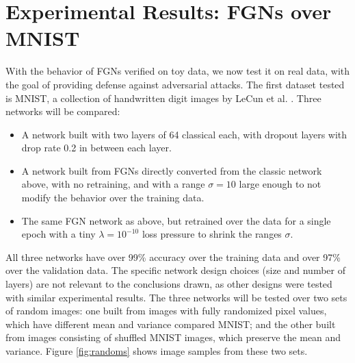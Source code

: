\documentclass[12pt,oneside]{CUNY_PhD}
\begin{document}
\chapter{Experimental Results: FGNs over MNIST}
With the behavior of FGNs verified on toy data, we now test it on real data, with the goal of providing defense against adversarial attacks. The first dataset tested is MNIST, a collection of handwritten digit images by LeCun et al. \cite{lecun-mnisthandwrittendigit-2010}. Three networks will be compared:
\begin{itemize}
    \item A network built with two layers of 64 classical each, with dropout layers with drop rate 0.2 in between each layer.
    \item A network built from FGNs directly converted from the classic network above, with no retraining, and with a range $\sigma=10$ large enough to not modify the behavior over the training data.
    \item The same FGN network as above, but retrained over the data for a single epoch with a tiny $\lambda=10^{-10}$ loss pressure to shrink the ranges $\sigma$.
\end{itemize}
All three networks have over 99\% accuracy over the training data and over 97\% over the validation data. The specific network design choices (size and number of layers) are not relevant to the conclusions drawn, as other designs were tested with similar experimental results. The three networks will be tested over two sets of random images: one built from images with fully randomized pixel values, which have different mean and variance compared MNIST; and the other built from images consisting of shuffled MNIST images, which preserve the mean and variance. Figure \ref{fig:randoms} shows image samples from these two sets.
\end{document}
